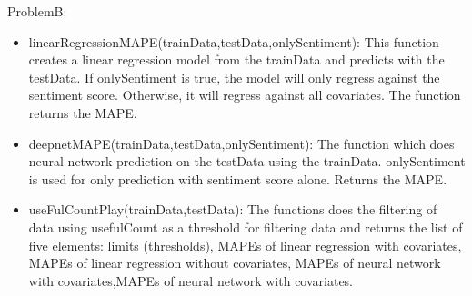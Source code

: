 \documentclass{article}
\begin{document}
\item ProblemB:
   \begin{itemize}
    \item linearRegressionMAPE(trainData,testData,onlySentiment): This function creates a linear regression model from the trainData and predicts with the testData. If onlySentiment is true, the model will only regress against the sentiment score. Otherwise, it will regress against all covariates. The function returns the MAPE.
    
    \item deepnetMAPE(trainData,testData,onlySentiment): The function which does neural network prediction on the testData using the trainData. onlySentiment is used for only prediction with sentiment score alone. Returns the MAPE.
    
    \item useFulCountPlay(trainData,testData): The functions does the filtering of data using usefulCount as a threshold for filtering data and returns the list of five elements: limits (thresholds), MAPEs of linear regression with covariates, MAPEs of linear regression without covariates, MAPEs of neural network with covariates,MAPEs of neural network with covariates.
    
    
    
   
   
   
   \end{itemize}
\end{document}
